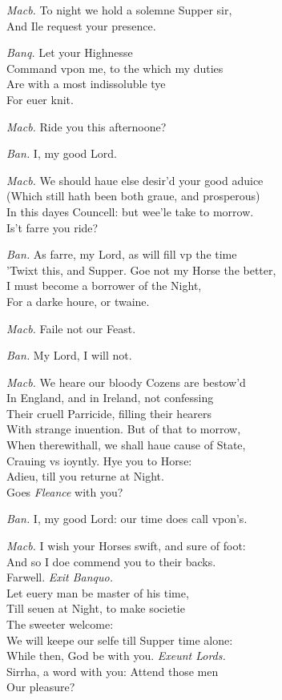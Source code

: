 \documentclass[12pt]{sides}
\newcommand{\clStageDir}[1]{\hspace*{\fill}\textit{#1}\hspace*{\fill}}
\newcommand{\elStageDir}[1]{\hfill\textit{#1}}
\newcommand{\dia}[1]{\hskip 15pt\textit{#1}\hskip 6pt}
\begin{document}
\begin{multicols}{2}
            \dia{Macb.} To night we hold a solemne Supper sir, \\ And Ile request your presence.

            \dia{Banq.} Let your Highnesse \\ Command vpon me, to the which my duties \\ Are with a most indissoluble tye \\ For euer knit.

            \dia{Macb.} Ride you this afternoone?

            \dia{Ban.} I, my good Lord.

            \dia{Macb.} We should haue else desir'd your good aduice \\ (Which still hath been both graue, and prosperous) \\ In this dayes Councell: but wee'le take to morrow. \\ Is't farre you ride?

            \dia{Ban.} As farre, my Lord, as will fill vp the time \\ 'Twixt this, and Supper. Goe not my Horse the better, \\ I must become a borrower of the Night, \\ For a darke houre, or twaine.

            \dia{Macb.} Faile not our Feast. %

            \dia{Ban.} My Lord, I will not.

            \dia{Macb.} We heare our bloody Cozens are bestow'd \\ In England, and in Ireland, not confessing \\ Their cruell Parricide, filling their hearers \\ With strange inuention. But of that to morrow, \\ When therewithall, we shall haue cause of State, \\ Crauing vs ioyntly. Hye you to Horse: \\ Adieu, till you returne at Night. \\ Goes \textit{Fleance} with you?

            \dia{Ban.} I, my good Lord: our time does call vpon's.

            \dia{Macb.} I wish your Horses swift, and sure of foot: \\ And so I doe commend you to their backs. \\ Farwell. \clStageDir{Exit Banquo.} \\ Let euery man be master of his time, \\ Till seuen at Night, to make societie \\ The sweeter welcome: \\ We will keepe our selfe till Supper time alone: \\ While then, God be with you. \elStageDir{Exeunt Lords.} \\ Sirrha, a word with you: Attend those men \\ Our pleasure?


\end{multicols}
\end{document}
